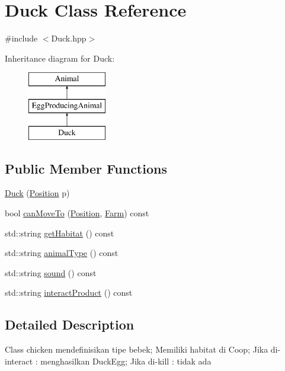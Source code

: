 \hypertarget{class_duck}{}\section{Duck Class Reference}
\label{class_duck}


{\ttfamily \#include $<$Duck.\+hpp$>$}

Inheritance diagram for Duck\+:\begin{figure}[H]
\begin{center}
\leavevmode
\includegraphics[height=3.000000cm]{class_duck}
\end{center}
\end{figure}
\subsection*{Public Member Functions}
\begin{DoxyCompactItemize}
\item 
\mbox{\hyperlink{class_duck_a07712e5ee93186becd20ee07a16430e7}{Duck}} (\mbox{\hyperlink{class_position}{Position}} p)
\item 
bool \mbox{\hyperlink{class_duck_a5b53ac1fbe028859bdc0149e6eeeef64}{can\+Move\+To}} (\mbox{\hyperlink{class_position}{Position}}, \mbox{\hyperlink{class_farm}{Farm}}) const
\item 
std\+::string \mbox{\hyperlink{class_duck_ada6104f405921dc1aaf38a7df72a8465}{get\+Habitat}} () const
\item 
std\+::string \mbox{\hyperlink{class_duck_a90ea0823650fe49eddba0d24647dd1bd}{animal\+Type}} () const
\item 
std\+::string \mbox{\hyperlink{class_duck_a26799f737ee32fd2b7cd871ec1a2727f}{sound}} () const
\item 
std\+::string \mbox{\hyperlink{class_duck_a38e775e1f4ab667eeb997fb36837b456}{interact\+Product}} () const
\end{DoxyCompactItemize}


\subsection{Detailed Description}
Class chicken mendefinisikan tipe bebek; Memiliki habitat di Coop; Jika di-\/interact \+: menghasilkan Duck\+Egg; Jika di-\/kill \+: tidak ada 

